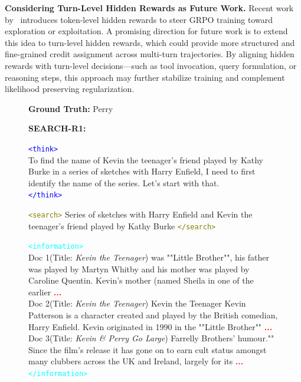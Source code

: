 \textbf{Considering Turn-Level Hidden Rewards as Future Work.} 
Recent work by~\cite{deng2025token} introduces token-level hidden rewards to steer GRPO training toward exploration or exploitation. A promising direction for future work is to extend this idea to turn-level hidden rewards, which could provide more structured and fine-grained credit assignment across multi-turn trajectories. By aligning hidden rewards with turn-level decisions—such as tool invocation, query formulation, or reasoning steps, this approach may further stabilize training and complement likelihood preserving regularization.

\begin{figure}[h]
\centering
\begin{tcolorbox}[colback=white,colframe=black!60,title=\textbf{Question:} What is the name of Kevin the teenager's friend played by Kathy Burke in a series of sketches with Harry Enfield?]

\textbf{Ground Truth:} Perry

\vspace{0.5em}
\textbf{SEARCH-R1:}

\textcolor{blue}{\texttt{<think>}}\\
To find the name of Kevin the teenager's friend played by Kathy Burke in a series of sketches with Harry Enfield, I need to first identify the name of the series. Let's start with that.
\\
\textcolor{blue}{\texttt{</think>}}

\vspace{0.5em}
\textcolor{olive}{\texttt{<search>}} Series of sketches with Harry Enfield and Kevin the teenager's friend played by Kathy Burke
\textcolor{olive}{\texttt{</search>}}

\vspace{0.5em}
\textcolor{cyan}{\texttt{<information>}}\\
Doc 1(Title: \textit{Kevin the Teenager}) was ""Little Brother"", his father was played by Martyn Whitby and his mother was played by Caroline Quentin. Kevin's mother (named Sheila in one of the earlier  \textcolor{red}{\textbf{...}}\\
Doc 2(Title: \textit{Kevin the Teenager}) Kevin the Teenager Kevin Patterson is a character created and played by the British comedian, Harry Enfield. Kevin originated in 1990 in the ""Little Brother""  \textcolor{red}{\textbf{...}}\\
Doc 3(Title: \textit{Kevin \& Perry Go Large}) Farrelly Brothers' humour."" Since the film's release it has gone on to earn cult status amongst many clubbers across the UK and Ireland, largely for its  \textcolor{red}{\textbf{...}}\\
\textcolor{cyan}{\texttt{</information>}}


\end{tcolorbox}
\end{figure}
